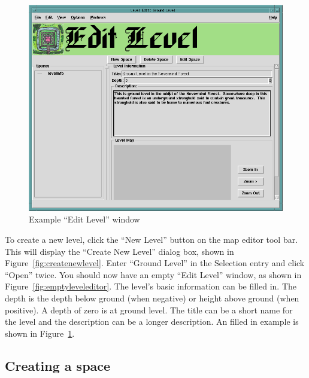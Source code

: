 \begin{figure}[hbpt]
\begin{centering}
\includegraphics[width=5in]{ExampleLevelEditorWindow.png}
\caption{Example ``Edit Level'' window}
\label{fig:exampleleveleditor}
\end{centering}
\end{figure}
To create a new level, click the ``New Level'' button on the map editor
tool bar.  This will display the ``Create New Level'' dialog box, shown
in Figure~\ref{fig:createnewlevel}. Enter ``Ground Level'' in the
Selection entry and click ``Open'' twice.  You should now have an empty
``Edit Level'' window, as shown in Figure~\ref{fig:emptyleveleditor}. 
The level's basic information can be filled in.  The depth is the depth
below ground (when negative) or height above ground (when positive).  A
depth of zero is at ground level.  The title can be a short name for the
level and the description can be a longer description.  An filled in
example is shown in Figure~\ref{fig:exampleleveleditor}.

\subsection{Creating a space}

